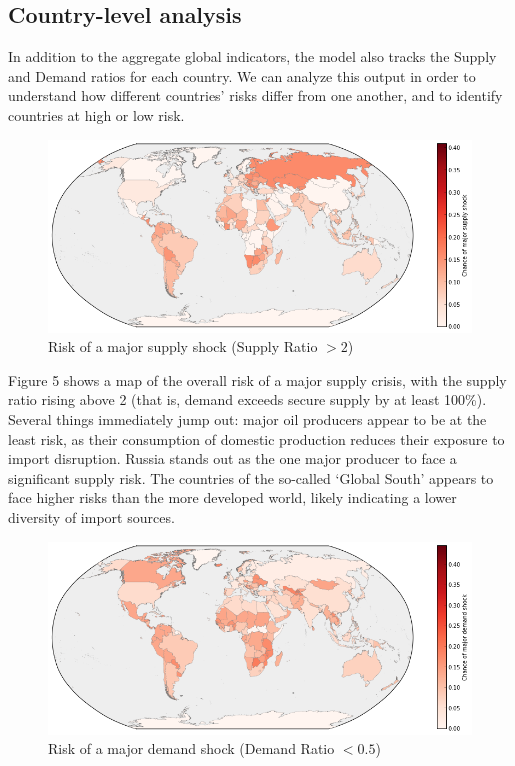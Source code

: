 \documentclass{llncs}
\begin{document}
\subsection{Country-level analysis}

In addition to the aggregate global indicators, the model also tracks the Supply and Demand ratios for each country. We can analyze this output in order to understand how different countries' risks differ from one another, and to identify countries at high or low risk.

\begin{figure}[h!]
	\centering
	\includegraphics[width=\textwidth]{../Graphics/SupplyShockMap}
	\caption{Risk of a major supply shock (Supply Ratio $>2$)}

\end{figure}

Figure 5 shows a map of the overall risk of a major supply crisis, with the supply ratio rising above 2 (that is, demand exceeds secure supply by at least 100\%). Several things immediately jump out: major oil producers appear to be at the least risk, as their consumption of domestic production reduces their exposure to import disruption. Russia stands out as the one major producer to face a significant supply risk. The countries of the so-called `Global South' appears to face higher risks than the more developed world, likely indicating a lower diversity of import sources.

\begin{figure}[h!]
	\centering
	\includegraphics[width=\textwidth]{../Graphics/DemandShockMap}
	\caption{Risk of a major demand shock (Demand Ratio $<0.5$)}

\end{figure}
\end{document}
